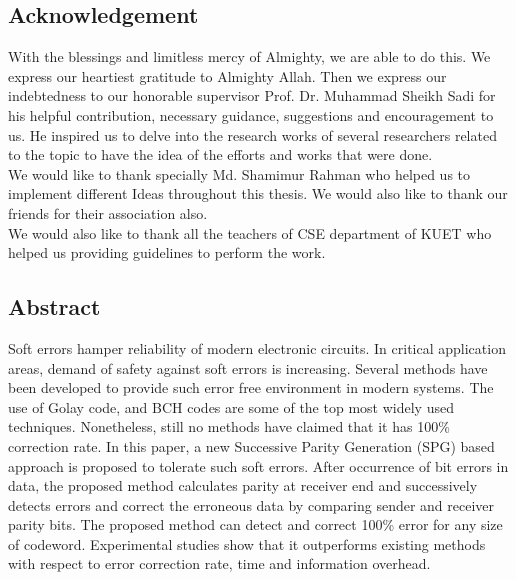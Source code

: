 \documentclass[12pt,a4paper]{report}
\begin{document}
\begin{center}
\section*{Acknowledgement}
\end{center}
With the blessings and limitless mercy of Almighty, we are able to do this. We express our heartiest gratitude to Almighty Allah. Then we express our indebtedness to our honorable supervisor Prof. Dr. Muhammad Sheikh Sadi for his helpful contribution, necessary guidance, suggestions and encouragement to us. He inspired us to delve into the research works of several researchers related to the topic to have the idea of the efforts and works that were done.\\

We would like to thank specially Md. Shamimur Rahman who helped us to implement different Ideas throughout this thesis. We would also like to thank our friends for their association also.\\

We would also like to thank all the teachers of CSE department of KUET who helped us providing guidelines to perform the work.\\
	 	
\cleardoublepage

\begin{center}
\section*{Abstract}
\end{center}
Soft errors hamper reliability of modern electronic circuits. In critical application areas, demand of safety against soft errors is increasing. Several methods have been developed to provide such error free environment in modern systems. The use of Golay code, and BCH codes are some of the top most widely used techniques. Nonetheless, still no methods have claimed that it has 100\% correction rate. In this paper, a new Successive Parity Generation (SPG) based approach is proposed to tolerate such soft errors. After occurrence of bit errors in data, the proposed method calculates parity at receiver end and successively detects errors and correct the erroneous data by comparing sender and receiver parity bits. The proposed method can detect and correct 100\% error for any size of codeword. Experimental studies show that it outperforms existing methods with respect to error correction rate, time and information overhead. 
\end{document}
